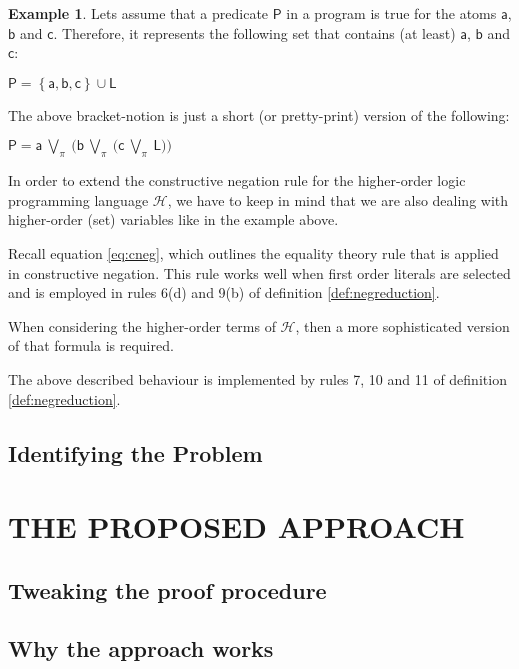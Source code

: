 \documentclass[inscr,ack,preface]{dithesis}
\theoremstyle{definition}
\newtheorem{example}{Example}[chapter]
\newcommand{\h}{$\mathcal{H}$}
\newcommand{\msf}[1]{$\mathsf{#1}$}
\begin{document}
\begin{example} Lets assume that a predicate \msf{P} in a program is true for the atoms \msf{a}, \msf{b} and \msf{c}. Therefore, it represents the following set that contains (at least) \msf{a}, \msf{b} and \msf{c}:
\begin{center}
  \msf{P = \left\{ a, b, c \right\} \cup L}
\end{center}

The above bracket-notion is just a short (or pretty-print) version of the following:
\begin{center}
  \msf{P = a ~\bigvee_{\pi}~ \big( b ~\bigvee_{\pi}~ \big( c ~\bigvee_{\pi}~ L \big) \big)}
\end{center}

\end{example}

In order to extend the constructive negation rule for the higher-order logic programming language \h{}, we have to keep in mind that we are also dealing with higher-order (set) variables like in the example above.

Recall equation \ref{eq:cneg}, which outlines the equality theory rule that is applied in constructive negation. This rule works well when first order literals are selected and is employed in rules 6(d) and 9(b) of definition \ref{def:negreduction}.

When considering the higher-order terms of \h{}, then a more sophisticated version of that formula is required.

The above described behaviour is implemented by rules 7, 10 and 11 of definition \ref{def:negreduction}.

\section{Identifying the Problem}

\chapter{THE PROPOSED APPROACH}
\label{chap:approach}

\section{Tweaking the proof procedure}

\section{Why the approach works}
\end{document}
